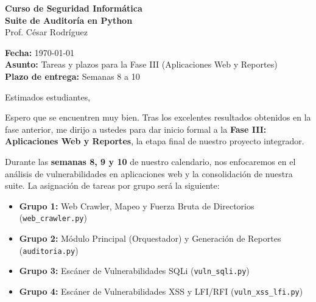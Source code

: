 \documentclass[12pt,letterpaper]{article}
\begin{document}
\begin{center}
    \Large \textbf{Curso de Seguridad Informática} \\
    \large \textbf{Suite de Auditoría en Python} \\
    \vspace{0.3cm}
    \normalsize Prof. César Rodríguez \\
\end{center}

\vspace{0.5cm}

\noindent \textbf{Fecha:} \today \\
\textbf{Asunto:} Tareas y plazos para la Fase III (Aplicaciones Web y Reportes) \\
\textbf{Plazo de entrega:} Semanas 8 a 10

\vspace{0.5cm}

\noindent Estimados estudiantes,

\vspace{0.3cm}

Espero que se encuentren muy bien. Tras los excelentes resultados obtenidos en la fase anterior, me dirijo a ustedes para dar inicio formal a la \textbf{Fase III: Aplicaciones Web y Reportes}, la etapa final de nuestro proyecto integrador. 

Durante las \textbf{semanas 8, 9 y 10} de nuestro calendario, nos enfocaremos en el análisis de vulnerabilidades en aplicaciones web y la consolidación de nuestra suite. La asignación de tareas por grupo será la siguiente:

\begin{itemize}
    \item \textbf{Grupo 1:} Web Crawler, Mapeo y Fuerza Bruta de Directorios (\texttt{web\_crawler.py})
    \item \textbf{Grupo 2:} Módulo Principal (Orquestador) y Generación de Reportes (\texttt{auditoria.py})
    \item \textbf{Grupo 3:} Escáner de Vulnerabilidades SQLi (\texttt{vuln\_sqli.py})
    \item \textbf{Grupo 4:} Escáner de Vulnerabilidades XSS y LFI/RFI (\texttt{vuln\_xss\_lfi.py})
\end{itemize}
\end{document}
